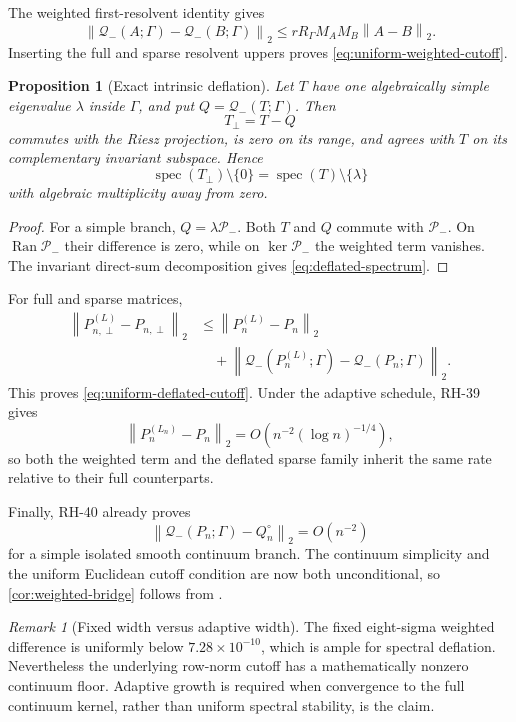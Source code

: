 \documentclass[11pt]{article}
\newtheorem{proposition}[theorem]{Proposition}
\theoremstyle{definition}
\theoremstyle{remark}
\newtheorem{remark}[theorem]{Remark}
\newcommand{\cQ}{\mathcal Q}
\newcommand{\cP}{\mathcal P}
\newcommand{\norm}[1]{\left\lVert #1\right\rVert}
\newcommand{\spec}{\operatorname{spec}}
\newcommand{\Ran}{\operatorname{Ran}}
\begin{document}
The weighted first-resolvent identity gives
\[
 \norm{\cQ_-(A;\Gamma)-\cQ_-(B;\Gamma)}_2
 \le rR_\Gamma M_AM_B\norm{A-B}_2.
\]
Inserting the full and sparse resolvent uppers proves
\eqref{eq:uniform-weighted-cutoff}.

\begin{proposition}[Exact intrinsic deflation]
\label{prop:deflation}
Let $T$ have one algebraically simple eigenvalue $\lambda$ inside $\Gamma$,
and put $Q=\cQ_-(T;\Gamma)$.  Then
\[
 T_\perp=T-Q
\]
commutes with the Riesz projection, is zero on its range, and agrees with
$T$ on its complementary invariant subspace.  Hence
\begin{equation}
 \spec(T_\perp)\setminus\{0\}
 =\spec(T)\setminus\{\lambda\}
 \label{eq:deflated-spectrum}
\end{equation}
with algebraic multiplicity away from zero.
\end{proposition}

\begin{proof}
For a simple branch, $Q=\lambda\cP_-$.  Both $T$ and $Q$ commute with
$\cP_-$.  On $\Ran\cP_-$ their difference is zero, while on
$\ker\cP_-$ the weighted term vanishes.  The invariant direct-sum
decomposition gives \eqref{eq:deflated-spectrum}.
\end{proof}

For full and sparse matrices,
\begin{align*}
 \norm{P_{n,\perp}^{(L)}-P_{n,\perp}}_2
 &\le\norm{P_n^{(L)}-P_n}_2\\
 &\quad+\norm{\cQ_-(P_n^{(L)};\Gamma)
                  -\cQ_-(P_n;\Gamma)}_2.
\end{align*}
This proves \eqref{eq:uniform-deflated-cutoff}.  Under the adaptive schedule,
RH-39 gives
\[
 \norm{P_n^{(L_n)}-P_n}_2
 =O\!\left(n^{-2}(\log n)^{-1/4}\right),
\]
so both the weighted term and the deflated sparse family inherit the same
rate relative to their full counterparts.

Finally, RH-40 already proves
\[
 \norm{\cQ_-(P_n;\Gamma)-Q_n^\circ}_2=O(n^{-2})
\]
for a simple isolated smooth continuum branch.  The continuum simplicity
and the uniform Euclidean cutoff condition are now both unconditional, so
\cref{cor:weighted-bridge} follows from
\citet{Atkinson1967,Anselone1971,Chatelin1983,WangRiesz2026}.

\begin{remark}[Fixed width versus adaptive width]
The fixed eight-sigma weighted difference is uniformly below
$7.28\times10^{-10}$, which is ample for spectral deflation.  Nevertheless
the underlying row-norm cutoff has a mathematically nonzero continuum floor.
Adaptive growth is required when convergence to the full continuum kernel,
rather than uniform spectral stability, is the claim.
\end{remark}
\end{document}

